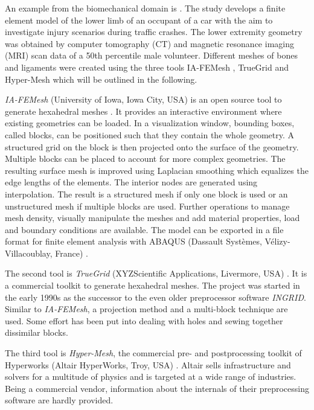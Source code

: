 An example from the biomechanical domain is \cite{untaroiu2013finite}. The study develops a finite element model of the lower limb of an occupant of a car with the aim to investigate injury scenarios during traffic crashes.
The lower extremity geometry was obtained by computer tomography (CT) and magnetic resonance imaging (MRI) scan data of a 50th percentile male volunteer. Different meshes of bones and ligaments were created using the three tools IA-FEMesh \cite{grosland2009ia}, TrueGrid \cite{TrueGrid} and Hyper-Mesh \cite{Hypermesh} which will be outlined in the following.

\emph{IA-FEMesh} (University of Iowa, Iowa City, USA) is an open source tool to generate hexahedral meshes \cite{grosland2009ia}. It provides an interactive environment where existing geometries can be loaded. In a visualization window, bounding boxes, called blocks, can be positioned such that they contain the whole geometry. A structured grid on the block is then projected onto the surface of the geometry. Multiple blocks can be placed to account for more complex geometries. The resulting surface mesh is improved using Laplacian smoothing which equalizes the edge lengths of the elements.
The interior nodes are generated using interpolation.
The result is a structured mesh if only one block is used or an unstructured mesh if multiple blocks are used. Further operations to manage mesh density, visually manipulate the meshes and add material properties, load and boundary conditions are available. The model can be exported in a file format for finite element analysis with ABAQUS (Dassault Systèmes, Vélizy-Villacoublay, France) \cite{ABAQUS}.

The second tool is \emph{TrueGrid} (XYZScientific Applications, Livermore, USA) \cite{TrueGrid}. It is a commercial toolkit to generate hexahedral meshes. The project was started in the early 1990s as the successor to the even older preprocessor software \emph{INGRID}. Similar to \emph{IA-FEMesh}, a projection method and a multi-block technique are used. Some effort has been put into dealing with holes and sewing together dissimilar blocks.

The third tool is \emph{Hyper-Mesh}, the commercial pre- and postprocessing toolkit of Hyperworks (Altair HyperWorks, Troy, USA) \cite{Hypermesh}.
Altair sells infrastructure and solvers for a multitude of physics and is targeted at a wide range of industries. 
Being a commercial vendor, information about the internals of their preprocessing software are hardly provided.

